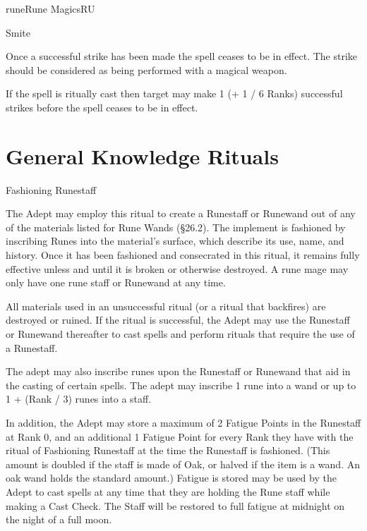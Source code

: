 \begin{College}[2.2]{rune}{Rune Magics}{RU}
\begin{spell}[G-7]{Smite}
\begin{effects}
Once a successful strike has been made the spell ceases to be in
effect. The strike should be considered as being performed with a
magical weapon.

If the spell is ritually cast then target may make 1 (+ 1 / 6 Ranks)
successful strikes before the spell ceases to be in effect.
\end{effects}
\end{spell}

\section{General Knowledge Rituals}

\begin{ritual}[Q-1]{Fashioning Runestaff}

\begin{effects}
The Adept may employ this ritual to create a Runestaff or Runewand out
of any of the materials listed for Rune Wands (§26.2). The implement
is fashioned by inscribing Runes into the material’s surface, which
describe its use, name, and history.  Once it has been fashioned and
consecrated in this ritual, it remains fully effective unless and
until it is broken or otherwise destroyed.  A rune mage may only have
one rune staff or Runewand at any time.

All materials used in an unsuccessful ritual (or a ritual that
backfires) are destroyed or ruined. If the ritual is successful, the
Adept may use the Runestaff or Runewand thereafter to cast spells and
perform rituals that require the use of a Runestaff.

The adept may also inscribe runes upon the Runestaff or Runewand that
aid in the casting of certain spells. The adept may inscribe 1 rune
into a wand or up to 1 + (Rank / 3) runes into a staff.

In addition, the Adept may store a maximum of 2 Fatigue Points in the
Runestaff at Rank 0, and an additional 1 Fatigue Point for every Rank
they have with the ritual of Fashioning Runestaff at the time the
Runestaff is fashioned.  (This amount is doubled if the staff is made
of Oak, or halved if the item is a wand.  An oak wand holds the
standard amount.)  Fatigue is stored may be used by the Adept to cast
spells at any time that they are holding the Rune staff while making a
Cast Check. The Staff will be restored to full fatigue at midnight on
the night of a full moon.
\end{effects}
\end{ritual}


\end{College}
